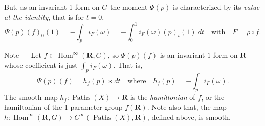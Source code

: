 \documentclass[10pt,reqno,twoside]{amsart}
\newcommand{\qmbox}[1]{\quad\mbox{#1}\quad}
\newcommand{\RR}{\mathbf{R}}
\DeclareMathOperator{\Hom}{Hom}
\DeclareMathOperator{\Paths}{Paths}
\newcommand{\Cinfty}{C^\infty}
\theoremstyle{plain}
\theoremstyle{definition}
\begin{document}
  But,
  as an invariant 1-form on $G$ the moment $\Psi(p)$ is characterized by its {\em value at the identity},
  that is for $t=0$,
  \begin{equation}
    \label{eq:diamondsuit}
    \Psi(p)(f)_0(1) = - \int_p i_F(\omega) = - \int_0^1 i_F(\omega)(p)_t(1) \ dt \qmbox{with} F = \rho \circ f.
  \end{equation}
  
  {\sc Note} --- Let $f \in \Hom^\infty(\RR,G)$,
  so $\Psi(p)(f)$ is an invariant $1$-form on $\RR$ whose coefficient is just $\int_p i_F(\omega)$.
  That is,
  $$
    \Psi(p)(f) = h_f(p) \times dt \qmbox{where} h_f(p) = - \int_p i_F(\omega).
    $$
  The smooth map $h_f : \Paths(X) \to \RR$ is the {\em hamiltonian} of $f$,
  or the hamiltonian of the 1-parameter group $f(\RR)$.
  Note also that,
  the map $h : \Hom^\infty(\RR,G) \to \Cinfty(\Paths(X),\RR)$,
  defined above,
  is smooth.
  
\end{document}
